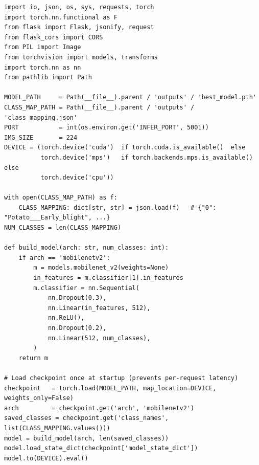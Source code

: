 \documentclass[12pt,a4paper]{report}
\begin{document}
\begin{lstlisting}[style=python, caption={Model loading and inference server initialisation (ml/serve.py)}]
import io, json, os, sys, requests, torch
import torch.nn.functional as F
from flask import Flask, jsonify, request
from flask_cors import CORS
from PIL import Image
from torchvision import models, transforms
import torch.nn as nn
from pathlib import Path

MODEL_PATH     = Path(__file__).parent / 'outputs' / 'best_model.pth'
CLASS_MAP_PATH = Path(__file__).parent / 'outputs' / 'class_mapping.json'
PORT           = int(os.environ.get('INFER_PORT', 5001))
IMG_SIZE       = 224
DEVICE = (torch.device('cuda')  if torch.cuda.is_available()  else
          torch.device('mps')   if torch.backends.mps.is_available() else
          torch.device('cpu'))

with open(CLASS_MAP_PATH) as f:
    CLASS_MAPPING: dict[str, str] = json.load(f)   # {"0": "Potato___Early_blight", ...}
NUM_CLASSES = len(CLASS_MAPPING)

def build_model(arch: str, num_classes: int):
    if arch == 'mobilenetv2':
        m = models.mobilenet_v2(weights=None)
        in_features = m.classifier[1].in_features
        m.classifier = nn.Sequential(
            nn.Dropout(0.3),
            nn.Linear(in_features, 512),
            nn.ReLU(),
            nn.Dropout(0.2),
            nn.Linear(512, num_classes),
        )
    return m

# Load checkpoint once at startup (prevents per-request latency)
checkpoint   = torch.load(MODEL_PATH, map_location=DEVICE, weights_only=False)
arch         = checkpoint.get('arch', 'mobilenetv2')
saved_classes = checkpoint.get('class_names', list(CLASS_MAPPING.values()))
model = build_model(arch, len(saved_classes))
model.load_state_dict(checkpoint['model_state_dict'])
model.to(DEVICE).eval()
\end{lstlisting}
\end{document}
